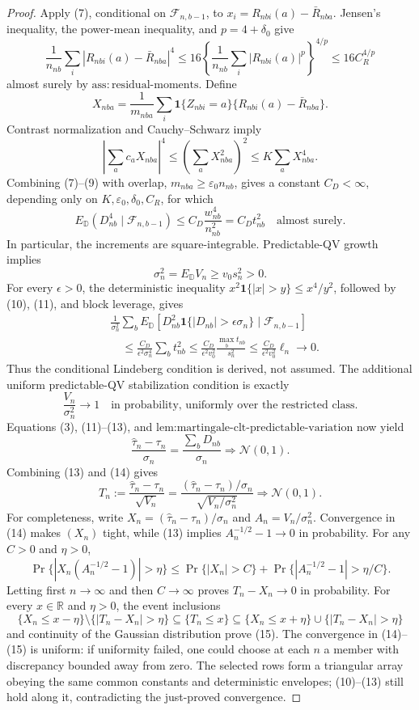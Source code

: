 \documentclass{article}
\begin{document}
\begin{proof}
Apply (7), conditional on \(\mathcal F_{n,b-1}\), to
\(x_i=R_{nbi}(a)-\bar R_{nba}\).  Jensen's inequality, the power-mean inequality, and \(p=4+\delta_0\) give
\[
\frac1{n_{nb}}\sum_i|R_{nbi}(a)-\bar R_{nba}|^4
\le16\left\{\frac1{n_{nb}}\sum_i|R_{nbi}(a)|^p\right\}^{4/p}
\le16C_R^{4/p}
\tag{8}
\]
almost surely by \(\mathrm{ass:residual\text{-}moments}\).  Define
\[
X_{nba}=\frac1{m_{nba}}\sum_i\mathbf1\{Z_{nbi}=a\}
\{R_{nbi}(a)-\bar R_{nba}\}.
\]
Contrast normalization and Cauchy--Schwarz imply
\[
\left|\sum_ac_aX_{nba}\right|^4
\le\left(\sum_aX_{nba}^2\right)^2
\le K\sum_aX_{nba}^4.
\tag{9}
\]
Combining (7)--(9) with overlap, \(m_{nba}\ge\varepsilon_0n_{nb}\), gives a constant \(C_D<\infty\), depending only on \(K,\varepsilon_0,\delta_0,C_R\), for which
\[
E_{\mathbb D}(D_{nb}^4\mid\mathcal F_{n,b-1})
\le C_D\frac{w_{nb}^4}{n_{nb}^2}=C_Dt_{nb}^2
\quad\text{almost surely}.
\tag{10}
\]
In particular, the increments are square-integrable.  Predictable-QV growth implies
\[
\sigma_n^2=E_{\mathbb D}V_n\ge v_0s_n^2>0.
\tag{11}
\]
For every \(\epsilon>0\), the deterministic inequality
\(x^2\mathbf1\{|x|>y\}\le x^4/y^2\), followed by (10), (11), and block leverage, gives
\[
\begin{aligned}
&\frac1{\sigma_n^2}\sum_bE_{\mathbb D}\!\left[D_{nb}^2
 \mathbf1\{|D_{nb}|>\epsilon\sigma_n\}\mid\mathcal F_{n,b-1}\right]\\
&\quad\le\frac{C_D}{\epsilon^2\sigma_n^4}\sum_bt_{nb}^2
\le\frac{C_D}{\epsilon^2v_0^2}
 \frac{\max_bt_{nb}}{s_n^2}
\le\frac{C_D}{\epsilon^2v_0^2}\ell_n
\longrightarrow0.
\end{aligned}
\tag{12}
\]
Thus the conditional Lindeberg condition is derived, not assumed.  The additional uniform predictable-QV stabilization condition is exactly
\[
\frac{V_n}{\sigma_n^2}\longrightarrow1
\quad\text{in probability, uniformly over the restricted class}.
\tag{13}
\]
Equations (3), (11)--(13), and \(\text{lem:martingale-clt-predictable-variation}\) now yield
\[
\frac{\widehat\tau_n-\tau_n}{\sigma_n}
=\frac{\sum_bD_{nb}}{\sigma_n}\Rightarrow\mathcal N(0,1).
\tag{14}
\]
Combining (13) and (14) gives
\[
T_n:=\frac{\widehat\tau_n-\tau_n}{\sqrt{V_n}}
=\frac{(\widehat\tau_n-\tau_n)/\sigma_n}{\sqrt{V_n/\sigma_n^2}}
\Rightarrow\mathcal N(0,1).
\tag{15}
\]
For completeness, write \(X_n=(\widehat\tau_n-\tau_n)/\sigma_n\) and \(A_n=V_n/\sigma_n^2\).  Convergence in (14) makes \((X_n)\) tight, while (13) implies \(A_n^{-1/2}-1\to0\) in probability.  For any \(C>0\) and \(\eta>0\),
\[
\Pr\{|X_n(A_n^{-1/2}-1)|>\eta\}
\le \Pr\{|X_n|>C\}+\Pr\{|A_n^{-1/2}-1|>\eta/C\}.
\]
Letting first \(n\to\infty\) and then \(C\to\infty\) proves \(T_n-X_n\to0\) in probability.  For every \(x\in\mathbb R\) and \(\eta>0\), the event inclusions
\[
\{X_n\le x-\eta\}\setminus\{|T_n-X_n|>\eta\}
\subseteq\{T_n\le x\}
\subseteq\{X_n\le x+\eta\}\cup\{|T_n-X_n|>\eta\}
\]
and continuity of the Gaussian distribution prove (15).  The convergence in (14)--(15) is uniform: if uniformity failed, one could choose at each \(n\) a member with discrepancy bounded away from zero.  The selected rows form a triangular array obeying the same common constants and deterministic envelopes; (10)--(13) still hold along it, contradicting the just-proved convergence.


\end{proof}
\end{document}
